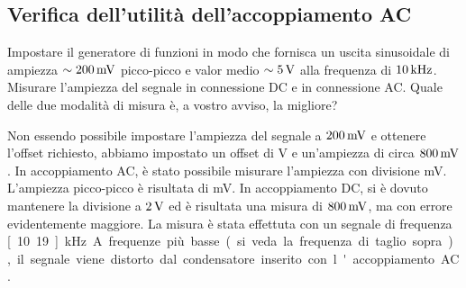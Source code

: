 \documentclass[italian,a4paper]{article}
\begin{document}
\subsection*{Verifica dell'utilità dell’accoppiamento AC}
Impostare il generatore di funzioni in modo che fornisca un uscita sinusoidale di ampiezza $\sim
\unit[200]{mV}$ picco-picco e valor medio $\sim \unit[5]{V}$ alla frequenza di $\unit[10]{kHz}$. Misurare
l'ampiezza del segnale in connessione DC e in connessione AC. Quale delle due modalità di misura è, a vostro
avviso, la migliore?

Non essendo possibile impostare l'ampiezza del segnale a $\unit[200]{mV}$ e ottenere l'offset richiesto,
abbiamo impostato un offset di \unit[5]{V} e un'ampiezza di circa
$\unit[800]{mV}$. In accoppiamento AC, è stato possibile misurare l'ampiezza
con divisione \unit[200]{mV}. L'ampiezza picco-picco è
risultata di \unit[832]{mV}. In accoppiamento DC, si è dovuto mantenere la
divisione a $\unit[2]{V}$ ed è risultata una misura di $\unit[800]{mV}$, ma
con errore evidentemente maggiore. La misura è stata effettuta con un segnale di frequenza \unit[10.19]{kHz}. A
frequenze più basse (si veda la frequenza di taglio sopra), il segnale viene
distorto dal condensatore inserito con l'accoppiamento AC.
\end{document}
